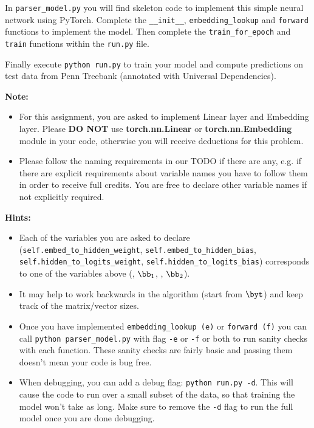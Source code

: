 \begin{parts}
\begin{enumerate}[label=\roman*.]
        In \texttt{parser\_model.py} you will find skeleton code to implement this simple neural network using PyTorch. Complete the \texttt{\_\_init\_\_}, \texttt{embedding\_lookup} and \texttt{forward} functions to implement the model. Then complete the \texttt{train\_for\_epoch} and \texttt{train} functions within the \texttt{run.py} file.
   
        Finally execute \texttt{python run.py} to train your model and compute predictions
        on test data from Penn Treebank (annotated with Universal Dependencies). 
    
    \textbf{Note:}
    \begin{itemize}
        \item For this assignment, you are asked to implement Linear layer and Embedding layer. Please \textbf{DO NOT} use \textbf{torch.nn.Linear} or  \textbf{torch.nn.Embedding} module in your code, otherwise you will receive deductions for this problem. 
        \item Please follow the naming requirements in our TODO if there are any, e.g. if there are explicit requirements about variable names you have to follow them in order to receive full credits. You are free to declare other variable names if not explicitly required. 
    \end{itemize}
    
    \textbf{Hints:}
    \begin{itemize}
        \item Each of the variables you are asked to declare (\texttt{self.embed\_to\_hidden\_weight}, \newline \texttt{self.embed\_to\_hidden\_bias}, \texttt{self.hidden\_to\_logits\_weight}, \newline \texttt{self.hidden\_to\_logits\_bias}) corresponds to one of the variables above (\bW, $\bb_1$, \bU, $\bb_2$).  
        \item It may help to work backwards in the algorithm (start from $\byt$) and keep track of the matrix/vector sizes.  
        \item Once you have implemented \texttt{embedding\_lookup (e)} or \texttt{forward (f)} you can call \texttt{python parser\_model.py} with flag \texttt{-e} or \texttt{-f} or both to run sanity checks with each function. These sanity checks are fairly basic and passing them doesn't mean your code is bug free.
        \item
            When debugging, you can add a debug flag: \texttt{python run.py -d}. This will cause the code to run over a small subset of the data, so that training the model won't take as long. Make sure to remove the \texttt{-d} flag to run the full model once you are done debugging.


\end{itemize}
\end{enumerate}
\end{parts}
